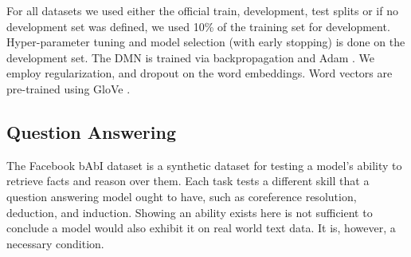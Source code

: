 \documentclass{article}
\begin{document}
For all datasets we used either the official train, development, test splits or if no development set was defined, we used 10\% of the training set for development. Hyper-parameter tuning and model selection (with early stopping) is done on the development set.
The DMN is trained via backpropagation and Adam \cite{Kingma2014}. 
We employ  regularization, and dropout on the word embeddings. Word vectors are pre-trained using GloVe \cite{Pennington2014}. 

\subsection{Question Answering}
The Facebook bAbI dataset is a synthetic dataset for testing a model's ability to retrieve facts and reason over them. Each task tests a different skill that a question answering model ought to have, such as coreference resolution, deduction, and induction. Showing an ability exists here is not sufficient to conclude a model would also exhibit it on real world text data. It is, however, a necessary condition.
\end{document}

